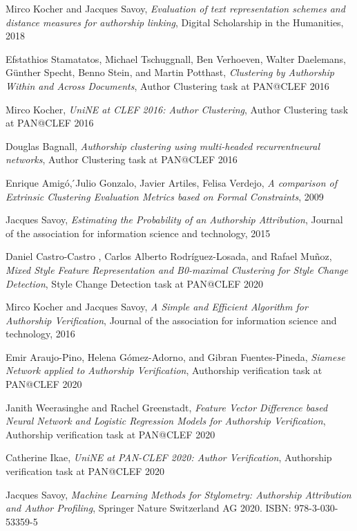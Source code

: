 \begin{thebibliography}{9}


Mirco Kocher and Jacques Savoy,
\textit{Evaluation of text representation schemes and distance measures for authorship linking},
Digital Scholarship in the Humanities, 2018

Efstathios Stamatatos, Michael Tschuggnall, Ben Verhoeven, Walter Daelemans, Günther Specht, Benno Stein, and Martin Potthast,
\textit{Clustering by Authorship Within and Across Documents},
Author Clustering task at PAN@CLEF 2016

Mirco Kocher,
\textit{UniNE at CLEF 2016: Author Clustering},
Author Clustering task at PAN@CLEF 2016

Douglas Bagnall,
\textit{Authorship clustering using multi-headed recurrentneural networks},
Author Clustering task at PAN@CLEF 2016


Enrique Amigó, ́Julio Gonzalo, Javier Artiles, Felisa Verdejo,
\textit{A comparison of Extrinsic Clustering Evaluation Metrics based on Formal Constraints},
2009

Jacques Savoy,
\textit{Estimating the Probability of an Authorship Attribution},
Journal of the association for information science and technology, 2015

Daniel Castro-Castro , Carlos Alberto Rodríguez-Losada, and Rafael Muñoz,
\textit{Mixed Style Feature Representation and B0-maximal Clustering for Style Change Detection},
Style Change Detection task at PAN@CLEF 2020

Mirco Kocher and Jacques Savoy,
\textit{A Simple and Efficient Algorithm for Authorship Verification},
Journal of the association for information science and technology, 2016

Emir Araujo-Pino, Helena Gómez-Adorno, and Gibran Fuentes-Pineda,
\textit{Siamese Network applied to Authorship Verification},
Authorship verification task at PAN@CLEF 2020

Janith Weerasinghe and Rachel Greenstadt,
\textit{Feature Vector Difference based Neural Network and Logistic Regression Models for Authorship Verification},
Authorship verification task at PAN@CLEF 2020

Catherine Ikae,
\textit{UniNE at PAN-CLEF 2020: Author Verification},
Authorship verification task at PAN@CLEF 2020

Jacques Savoy,
\textit{Machine Learning Methods for Stylometry: Authorship Attribution and Author Profiling},
Springer Nature Switzerland AG 2020. ISBN: 978-3-030-53359-5

\end{thebibliography}
